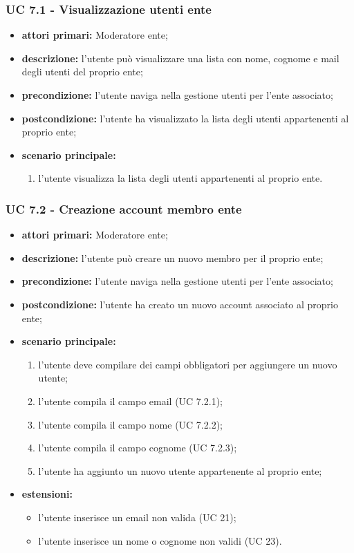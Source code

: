 			\subsubsection{UC 7.1 - Visualizzazione utenti ente}
			\begin{itemize}
				\item \textbf{attori primari:} Moderatore ente;
				\item \textbf{descrizione:} l'utente può visualizzare una lista con nome, cognome e mail degli utenti del proprio ente;
				\item \textbf{precondizione:} l'utente naviga nella gestione utenti per l'ente associato;
				\item \textbf{postcondizione:} l'utente ha visualizzato la lista degli utenti appartenenti al proprio ente;
				\item \textbf{scenario principale:}
				\begin{enumerate}
					\item{l'utente visualizza la lista degli utenti appartenenti al proprio ente.}
				\end{enumerate}	
			\end{itemize}
			
			\subsubsection{UC 7.2 - Creazione account membro ente}
			\begin{itemize}
				\item \textbf{attori primari:} Moderatore ente;
				\item \textbf{descrizione:} l'utente può creare un nuovo membro per il proprio ente;
				\item \textbf{precondizione:} l'utente naviga nella gestione utenti per l'ente associato;
				\item \textbf{postcondizione:} l'utente ha creato un nuovo account associato al proprio ente;
				\item \textbf{scenario principale:}
				\begin{enumerate}
					\item{l'utente deve compilare dei campi obbligatori per aggiungere un nuovo utente;}
					\item{l'utente compila il campo email (UC 7.2.1);}
					\item{l'utente compila il campo nome (UC 7.2.2);}
					\item{l'utente compila il campo cognome (UC 7.2.3);}
					\item{l'utente ha aggiunto un nuovo utente appartenente al proprio ente;}
				\end{enumerate}	
				\item \textbf{estensioni:}
				\begin{itemize}
					\item l'utente inserisce un email non valida (UC 21);
					\item l'utente inserisce un nome o cognome non validi (UC 23).
				\end{itemize}
			\end{itemize}
			
